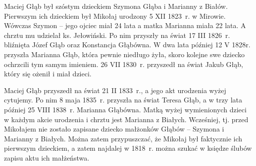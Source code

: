 Maciej Głąb był szóstym dzieckiem Szymona Głąba i Marianny z Białów. Pierwszym ich dzieckiem był Mikołaj urodzony 5 XII 1823~r. w Mirowie. Wówczas Szymon -- jego ojciec miał 24 lata a matka Marianna miała 22 lata. A chrztu mu udzielał ks. Jełowiński. Po nim przyszły na świat 17 III 1826~r. bliźnięta Józef Głąb oraz Konstancja Głąbówna. W dwa lata później 12 V 1828r. przyszła Marianna Głąb, która pewnie niedługo żyła, skoro kolejne swe dziecko ochrzcili tym samym imieniem. 26 VII 1830~r. przyszedł na świat Jakub Głąb, który się ożenił i miał dzieci. 

Maciej Głąb przyszedł na świat 21 II 1833~r., a jego akt urodzenia wyżej cytujemy. Po nim 8 maja 1835~r. przyszła na świat Teresa Głąb, a w trzy lata później 25 VIII 1838~r. Marianna Głąbówna. Matką wyżej wymienionych dzieci w każdym akcie urodzenia i chrztu jest Marianna z Białych. Wcześniej, tj. przed Mikołajem nie zostało zapisane dziecko  małżonków Głąbów -- Szymona i Marianny z Białych. Można zatem przypuszczać, że Mikołaj był faktycznie ich pierwszym dzieckiem, a zatem najdalej w 1818~r. można szukać w księdze ślubów zapisu aktu ich małżeństwa.

